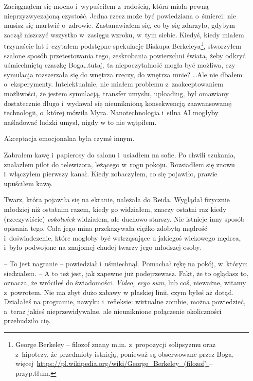 \documentclass[oneside,polish,11pt,sfheadings]{mwbk}
\begin{document}
Zaciągnąłem się mocno i~wypuściłem z~radością, która miała pewną
nieprzyzwyczajoną czystość. Jedna rzecz może być powiedziana o~śmierci:
nie musisz się martwić o~zdrowie. Zastanawiałem się, co by się zdarzyło,
gdybym zaczął niszczyć wszystko w~zasięgu wzroku, w~tym siebie. Kiedyś,
kiedy miałem trzynaście lat i~czytałem podstępne spekulacje Biskupa
Berkeleya\footnote{George Berkeley -- filozof znany
m.in. z~propozycji solipsyzmu oraz z~hipotezy, że przedmioty istnieją,
ponieważ są obserwowane przez Boga,
więcej~\url{https://pl.wikipedia.org/wiki/George_Berkeley_(filozof)
} -- przyp.tłum.}, stworzyłem szalone sposób przetestowania tego, zeskrobania
powierzchni świata, żeby odkryć uśmiechniętą czaszkę Boga\ldots tutaj, ta
niepoczytalność mogła być możliwa, czy symulacja rozszerzała się do
wnętrza rzeczy, do wnętrza mnie? \ldots Ale nie dbałem o~eksperymenty. Intelektualnie, nie
miałem problemu z~zaakceptowaniem możliwości, że jestem symulacją,
transfer umysłu, uploading, był omawiany dostatecznie długo i~wydawał
się nieuniknioną konsekwencją zaawansowanej technologii, o~której mówiła
Myra. Nanotechnologia i~silna AI mogłyby naśladować ludzki umysł, nigdy
w to nie wątpiłem.

Akceptacja emocjonalna była czymś innym.

Zabrałem kawę i~papierosy do salonu i~usiadłem na sofie. Po chwili
szukania, znalazłem pilot do telewizora, leżącego w~rogu pokoju.
Rozsiadłem się znowu i~włączyłem pierwszy kanał. Kiedy zobaczyłem, co
się pojawiło, prawie upuściłem kawę.

Twarz, która pojawiła się na ekranie, należała do Reida. Wyglądał
fizycznie młodziej niż ostatnim razem, kiedy go widziałem, znaczy
ostatni raz kiedy (rzeczywiście) \emph{cokolwiek} widziałem, ale duchowo
starszy. Nie istnieje inny sposób opisania tego. Cała jego mina
przekazywała ciężko zdobytą mądrość i~doświadczenie, które mogłoby być
wstrząsające u jakiegoś wiekowego mędrca, i~było podwojone na znajomej
chudej twarzy jego młodszej osoby.

-- To jest nagranie -- powiedział i~uśmiechnął. Pomachał rękę na pokój, w~którym siedziałem. -- A to też jest, jak zapewne już podejrzewasz. Fakt,
że to oglądasz to, oznacza, że wróciłeś do świadomości. \emph{Video,
ergo sum}, lub coś, nieważne, witamy z~powrotem. Nie ma zbyt dużo zabawy
w płaskiej linii, czym byłeś aż dotąd. Działałeś na programie, nawyku i~refleksie: wirtualne zombie, można powiedzieć, a~teraz jakieś
nieprzewidywalne, ale nieuniknione połączenie okoliczności przebudziło
cię.
\end{document}
